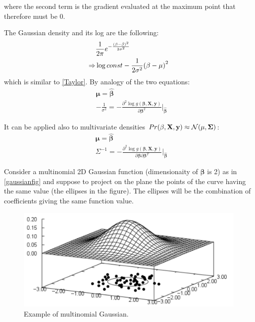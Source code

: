 \documentclass[12pt, letterpaper]{article}
\theoremstyle{definition}
\newcommand{\X}{\mathrm{\mathbf{X}}}
\newcommand{\y}{\mathbf{y}}
\newcommand{\be}{\mathbf{\beta}}
\newcommand{\hbe}{\hat{\mathbf{\beta}}}
\DeclarePairedDelimiter\autobracket{(}{)}
\newcommand{\br}[1]{\autobracket*{#1}}
\begin{document}
where the second term is the gradient evaluated at the maximum point that therefore must be $0$.

The Gaussian density and its log are the following:
\begin{equation}
\begin{aligned}
&\frac{1}{2\pi}e^{-\frac{(\be-\hbe)^2}{2\sigma^2}}\\
\Rightarrow &\log const -\frac{1}{2\sigma^2}\br{\be-\mu}^2
\end{aligned}
\end{equation}
which is similar to \autoref{Taylor}. By analogy of the two equations:
\begin{equation}
\begin{aligned}
&\mathbf{\mu} = \hbe\\
&-\frac{1}{\sigma^2} = -\frac{ \partial^2 \log g(\be,\X,\y)}{\partial \be^2}\bigg\rvert_{\hbe}
\end{aligned}
\end{equation}

It can be applied also to multivariate densities  $Pr(\be,\X,\y) \approx \CMcal{N}(\mathbf{\mu, \Sigma})$:
\begin{equation}
\begin{aligned}
&\mathbf{\mu} = \hbe\\
&\Sigma^{-1} = -\frac{ \partial^2 \log g(\be,\X,\y)}{\partial \be\partial\be^T}\bigg\rvert_{\hbe}
\end{aligned}
\end{equation}

Consider a multinomial 2D Gaussian function (dimensionaity of $\be$ is 2) as in \autoref{gaussianfig} and suppose to project on the plane the points of the curve having the same value (the ellipses in the figure). The ellipses will be the combination of coefficients giving the same function value.
\begin{figure}
\centering
\includegraphics[scale=0.4]{img/gaussian}
\caption{Example of multinomial Gaussian.}
\label{gaussianfig}
\end{figure}
\end{document}
